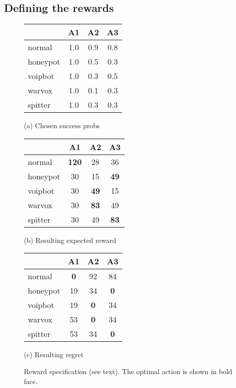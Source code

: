 \documentclass{llncs}
\begin{document}
\subsection{Defining the rewards}
\begin{figure*}[!t]
\begin{center}
\begin{minipage}{0.3\textwidth}
\begin{center}
{\small
\begin{tabular}{|l||c|c|c|}
\hline
& \bf A1 & \bf A2 & \bf A3 \\
\hline
\hline
normal   & 1.0 & 0.9 & 0.8 \\
honeypot & 1.0 & 0.5 & 0.3 \\
voipbot  & 1.0 & 0.3 & 0.5 \\
warvox   & 1.0 & 0.1 & 0.3 \\
spitter  & 1.0 & 0.3 & 0.3 \\
\hline
\end{tabular}
}
\smallskip

\centerline{\scriptsize (a) Chosen success probs}
\end{center}
\end{minipage}
\begin{minipage}{0.3\textwidth}
\begin{center}
{\small
\begin{tabular}{|l||c|c|c|}
\hline
& \bf A1 & \bf A2 & \bf A3 \\
\hline
\hline
normal   & \bf 120 & 28     & 36 \\
honeypot & 30      & 15     & \bf 49 \\
voipbot  & 30      & \bf 49 & 15 \\
warvox   & 30      & \bf 83 & 49 \\
spitter  & 30      & 49     & \bf 83 \\
\hline
\end{tabular}
}
\smallskip

\centerline{\scriptsize (b) Resulting expected reward}
\end{center}
\end{minipage}
\begin{minipage}{0.3\textwidth}
\begin{center}
{\small
\begin{tabular}{|l||c|c|c|}
\hline
& \bf A1 & \bf A2 & \bf A3 \\
\hline
\hline
normal   & \bf 0 & 92     & 84 \\
honeypot & 19    & 34     & \bf 0 \\
voipbot  & 19    & \bf 0  & 34 \\
warvox   & 53    & \bf 0  & 34 \\
spitter  & 53    & 34     & \bf 0 \\
\hline
\end{tabular}
}
\smallskip

\centerline{\scriptsize (c) Resulting regret}
\end{center}
\end{minipage}


\caption{Reward specification (see text). The optimal action is shown in bold face.}
\label{fig:reward_specification}
\end{center}
\end{figure*}
\end{document}

